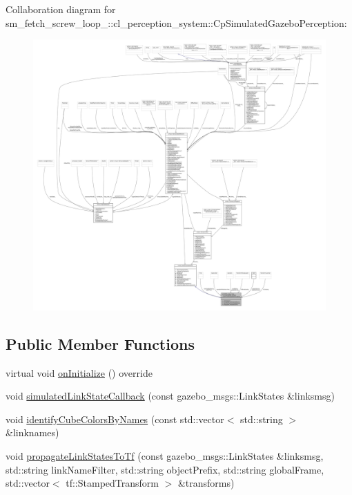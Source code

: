 Collaboration diagram for sm\+\_\+fetch\+\_\+screw\+\_\+loop\+\_\+:\+:cl\+\_\+perception\+\_\+system\+:\+:Cp\+Simulated\+Gazebo\+Perception\+:
\nopagebreak
\begin{figure}[H]
\begin{center}
\leavevmode
\includegraphics[width=350pt]{classsm__fetch__screw__loop__1_1_1cl__perception__system_1_1CpSimulatedGazeboPerception__coll__graph}
\end{center}
\end{figure}
\subsection*{Public Member Functions}
\begin{DoxyCompactItemize}
\item 
virtual void \hyperlink{classsm__fetch__screw__loop__1_1_1cl__perception__system_1_1CpSimulatedGazeboPerception_a2cde9f6f8ba4b5b660f7ac8cf86f9e29}{on\+Initialize} () override
\item 
void \hyperlink{classsm__fetch__screw__loop__1_1_1cl__perception__system_1_1CpSimulatedGazeboPerception_a83c115c056525c3b3da790ef020b3add}{simulated\+Link\+State\+Callback} (const gazebo\+\_\+msgs\+::\+Link\+States \&linksmsg)
\item 
void \hyperlink{classsm__fetch__screw__loop__1_1_1cl__perception__system_1_1CpSimulatedGazeboPerception_ac54440671eebf57be9d13b07902e47b2}{identify\+Cube\+Colors\+By\+Names} (const std\+::vector$<$ std\+::string $>$ \&linknames)
\item 
void \hyperlink{classsm__fetch__screw__loop__1_1_1cl__perception__system_1_1CpSimulatedGazeboPerception_a6eeedaceae67210042d0c2e9e1b497e7}{propagate\+Link\+States\+To\+Tf} (const gazebo\+\_\+msgs\+::\+Link\+States \&linksmsg, std\+::string link\+Name\+Filter, std\+::string object\+Prefix, std\+::string global\+Frame, std\+::vector$<$ tf\+::\+Stamped\+Transform $>$ \&transforms)
\end{DoxyCompactItemize}

